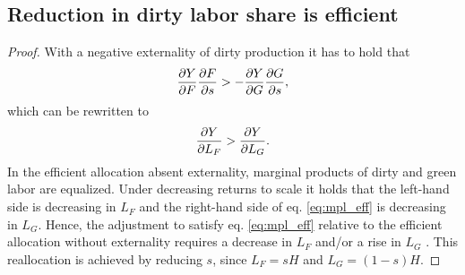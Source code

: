 \subsection{Reduction in dirty labor share is efficient}\label{app:redeffs}
\begin{proof}
	With a negative externality of dirty production it has to hold that 
	\begin{align}
	\frac{\partial{Y}}{\partial{F}}\frac{\partial{F}}{\partial{s}}>-\frac{\partial{Y}}{\partial{G}}\frac{\partial{G}}{\partial{s}},
	\end{align}
	which can be rewritten to 
	\begin{align}\label{eq:mpl_eff}
	\frac{\partial{Y}}{\partial{L_F}}>\frac{\partial{Y}}{\partial{L_G}}. 
	\end{align}
	In the efficient allocation absent externality, marginal products of dirty and green labor are equalized. 
	Under decreasing returns to scale it holds that the left-hand side is decreasing in $L_F$ and the right-hand side of eq. \eqref{eq:mpl_eff} is decreasing in $L_G$. Hence, the adjustment to satisfy eq. \eqref{eq:mpl_eff} relative to the efficient allocation without externality requires a decrease in $L_F$ and/or a rise in $L_G$  .
	This reallocation is achieved by reducing $s$, since $L_F=sH$ and $L_G=(1-s)H$.	
\end{proof}



